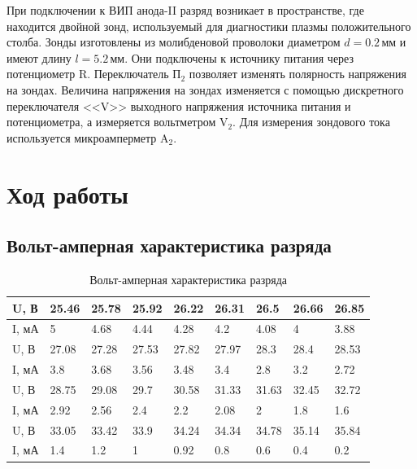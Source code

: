 \documentclass[a4paper,12pt]{article}
\begin{document}
		При подключении к ВИП анода-II разряд возникает в пространстве, где находится двойной зонд, используемый для диагностики плазмы положительного столба. Зонды изготовлены из молибденовой проволоки диаметром $d = 0.2\,\text{мм}$ и имеют длину $l = 5.2\,\text{мм}$. Они подключены к источнику питания через потенциометр $\mathrm{R}$. Переключатель $\text{П}_2$ позволяет изменять полярность напряжения на зондах. Величина напряжения на зондах изменяется  с помощью дискретного переключателя <<$\mathrm{V}$>> выходного напряжения источника питания и потенциометра, а измеряется вольтметром $\mathrm{V}_2$. Для измерения зондового тока используется микроамперметр $\mathrm{A}_2$.
		
		\section{Ход работы}
		\subsection{Вольт-амперная характеристика разряда}
		
		\begin{table}[h]
			\centering
			\caption{Вольт-амперная характеристика разряда}
			\label{my-label}
			\begin{tabular}{|l|l|l|l|l|l|l|l|l|}
				\hline
				U, В & 25.46 & 25.78 & 25.92 & 26.22 & 26.31 & 26.5  & 26.66 & 26.85 \\ \hline
				I, мА & 5     & 4.68  & 4.44  & 4.28  & 4.2   & 4.08  & 4     & 3.88  \\ \hline
				U, В & 27.08 & 27.28 & 27.53 & 27.82 & 27.97 & 28.3  & 28.4  & 28.53 \\ \hline
				I, мА & 3.8   & 3.68  & 3.56  & 3.48  & 3.4   & 2.8   & 3.2   & 2.72  \\ \hline
				U, В & 28.75 & 29.08 & 29.7  & 30.58 & 31.33 & 31.63 & 32.45 & 32.72 \\ \hline
				I, мА & 2.92  & 2.56  & 2.4   & 2.2   & 2.08  & 2     & 1.8   & 1.6   \\ \hline
				U, В & 33.05 & 33.42 & 33.9  & 34.24 & 34.34 & 34.78 & 35.14 & 35.84 \\ \hline
				I, мА & 1.4   & 1.2   & 1     & 0.92  & 0.8   & 0.6   & 0.4   & 0.2   \\ \hline
			\end{tabular}
		\end{table}
		
\end{document}
